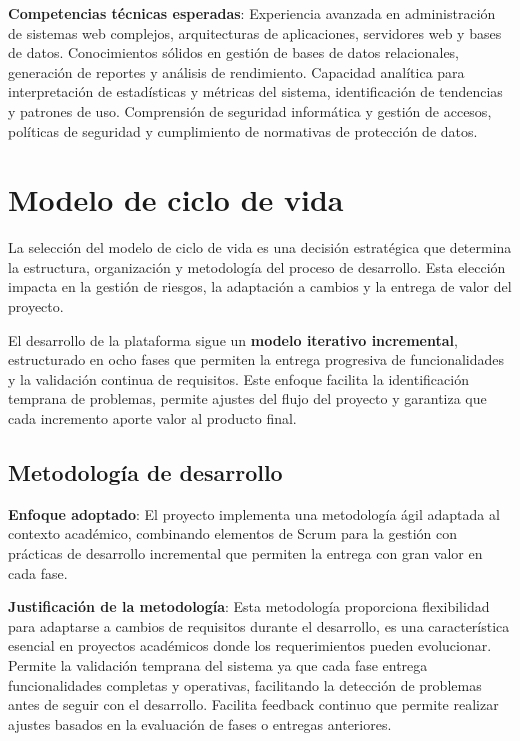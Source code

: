 \documentclass[12pt,a4paper,oneside]{report}
\begin{document}
\textbf{Competencias técnicas esperadas}: Experiencia avanzada en administración de sistemas web complejos, arquitecturas de aplicaciones, servidores web y bases de datos. Conocimientos sólidos en gestión de bases de datos relacionales, generación de reportes y análisis de rendimiento. Capacidad analítica para interpretación de estadísticas y métricas del sistema, identificación de tendencias y patrones de uso. Comprensión de seguridad informática y gestión de accesos, políticas de seguridad y cumplimiento de normativas de protección de datos.

\section{Modelo de ciclo de vida}\label{modelo-de-ciclo-de-vida}

La selección del modelo de ciclo de vida es una decisión estratégica que determina la estructura, organización y metodología del proceso de desarrollo. Esta elección impacta en la gestión de riesgos, la adaptación a cambios y la entrega de valor del proyecto.

El desarrollo de la plataforma sigue un \textbf{modelo iterativo incremental}, estructurado en ocho fases que permiten la entrega progresiva de funcionalidades y la validación continua de requisitos. Este enfoque facilita la identificación temprana de problemas, permite ajustes del flujo del proyecto y garantiza que cada incremento aporte valor al producto final.

\subsection{Metodología de
desarrollo}\label{metodologuxeda-de-desarrollo}

\textbf{Enfoque adoptado}: El proyecto implementa una metodología ágil
adaptada al contexto académico, combinando elementos de Scrum para la
gestión con prácticas de desarrollo incremental que permiten
la entrega con gran valor en cada fase.

\textbf{Justificación de la metodología}: Esta metodología proporciona flexibilidad para adaptarse a cambios de requisitos durante el desarrollo, es una característica esencial en proyectos académicos donde los requerimientos pueden evolucionar. Permite la validación temprana del sistema ya que cada fase entrega funcionalidades completas y operativas, facilitando la detección de problemas antes de seguir con el desarrollo. Facilita feedback continuo que permite realizar ajustes basados en la evaluación de fases o entregas anteriores.
\end{document}
